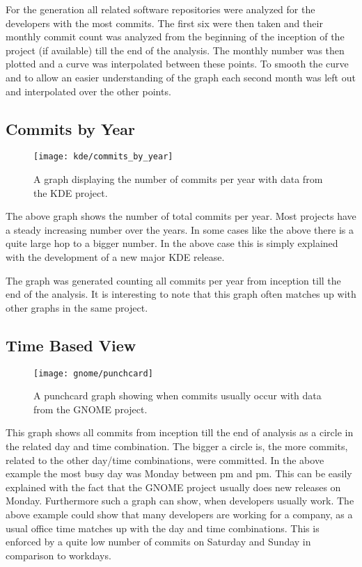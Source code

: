 For the generation all related software repositories were analyzed for the
developers with the most commits. The first six were then taken and their
monthly commit count was analyzed from the beginning of the inception of the
project (if available) till the end of the analysis. The monthly number was
then plotted and a curve was interpolated between these points. To smooth the
curve and to allow an easier understanding of the graph each second month was
left out and interpolated over the other points.



\subsection{Commits by Year} %

\begin{figure}[h!t]
  \centering
  \texttt{[image: kde/commits\_by\_year]}
  \caption{A graph displaying the number of commits per year with data from the
  KDE project.}
\end{figure}

The above graph shows the number of total commits per year. Most projects have
a steady increasing number over the years. In some cases like the above there
is a quite large hop to a bigger number. In the above case this is simply
explained with the development of a new major KDE release.

The graph was generated counting all commits per year from inception till the
end of the analysis. It is interesting to note that this graph often matches up
with other graphs in the same project.


\subsection{Time Based View} %

\begin{figure}[h!t]
  \centering
  \texttt{[image: gnome/punchcard]}
  \caption{A punchcard graph showing when commits usually occur with data from
  the GNOME project.}
\end{figure}

This graph shows all commits from inception till the end of analysis as a
circle in the related day and time combination. The bigger a circle is, the
more commits, related to the other day/time combinations, were committed. In
the above example the most busy day was Monday between \unit[4]{pm} and
\unit[12]{pm}. This can be easily explained with the fact that the GNOME
project usually does new releases on Monday. Furthermore such a graph can show,
when developers usually work. The above example could show that many developers
are working for a company, as a usual office time matches up with the day and
time combinations. This is enforced by a quite low number of commits on
Saturday and Sunday in comparison to workdays.

